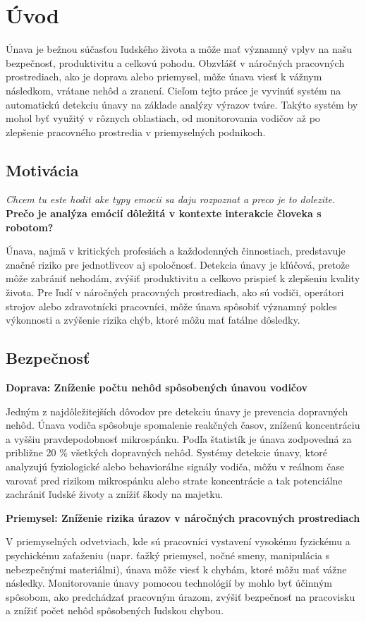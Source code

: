 \section{Úvod}
Únava je bežnou súčasťou ľudského života a môže mať významný vplyv na našu bezpečnosť, produktivitu a celkovú pohodu. Obzvlášť v náročných pracovných prostrediach, ako je doprava alebo priemysel, môže únava viesť k vážnym následkom, vrátane nehôd a zranení. Cieľom tejto práce je vyvinúť systém na automatickú detekciu únavy na základe analýzy výrazov tváre. Takýto systém by mohol byť využitý v rôznych oblastiach, od monitorovania vodičov až po zlepšenie pracovného prostredia v priemyselných podnikoch.
\subsection{Motivácia}
\textit{Chcem tu este hodit ake typy emocii sa daju rozpoznat a preco je to dolezite.}
\textbf{Prečo je analýza emócií dôležitá v kontexte interakcie človeka s robotom?}

Únava, najmä v kritických profesiách a každodenných činnostiach, predstavuje značné riziko pre jednotlivcov aj spoločnosť. Detekcia únavy je kľúčová, pretože môže zabrániť nehodám, zvýšiť produktivitu a celkovo prispieť k zlepšeniu kvality života. Pre ľudí v náročných pracovných prostrediach, ako sú vodiči, operátori strojov alebo zdravotnícki pracovníci, môže únava spôsobiť významný pokles výkonnosti a zvýšenie rizika chýb, ktoré môžu mať fatálne dôsledky.
\subsection{Bezpečnosť}
\textbf{Doprava: Zníženie počtu nehôd spôsobených únavou vodičov}

Jedným z najdôležitejších dôvodov pre detekciu únavy je prevencia dopravných nehôd. Únava vodiča spôsobuje spomalenie reakčných časov, zníženú koncentráciu a vyššiu pravdepodobnosť mikrospánku. Podľa štatistík je únava zodpovedná za približne 20 \% všetkých dopravných nehôd. Systémy detekcie únavy, ktoré analyzujú fyziologické alebo behaviorálne signály vodiča, môžu v reálnom čase varovať pred rizikom mikrospánku alebo strate koncentrácie a tak potenciálne zachrániť ľudské životy a znížiť škody na majetku.

\textbf{Priemysel: Zníženie rizika úrazov v náročných pracovných prostrediach}

V priemyselných odvetviach, kde sú pracovníci vystavení vysokému fyzickému a psychickému zaťaženiu (napr. ťažký priemysel, nočné smeny, manipulácia s nebezpečnými materiálmi), únava môže viesť k chybám, ktoré môžu mať vážne následky. Monitorovanie únavy pomocou technológií by mohlo byť účinným spôsobom, ako predchádzať pracovným úrazom, zvýšiť bezpečnosť na pracovisku a znížiť počet nehôd spôsobených ľudskou chybou.
